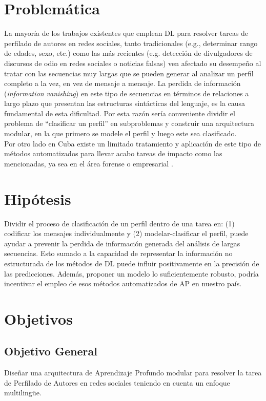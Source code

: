 \section*{Problemática}
La mayoría de los trabajos existentes que emplean DL para resolver tareas de perfilado de autores en redes sociales, tanto tradicionales (e.g., determinar rango de edades, sexo, etc.) como las más recientes (e.g. detección de divulgadores de discursos de odio en redes sociales o noticias falsas) ven afectado su desempeño al tratar con las secuencias muy largas que se pueden generar al analizar un perfil completo a la vez, en vez de mensaje a mensaje. La perdida de información (\textit{information vanishing}) en este tipo de secuencias en términos de relaciones a largo plazo que presentan las estructuras sintácticas del lenguaje, es la causa fundamental de esta dificultad. Por esta razón sería conveniente dividir el problema de ``clasificar un perfil'' en subproblemas y construir una arquitectura modular, en la que primero se modele el perfil y luego este sea clasificado.
\\
Por otro lado en Cuba existe un limitado tratamiento y aplicación de este tipo de métodos automatizados para llevar acabo tareas de impacto como las mencionadas, ya sea en el área forense o empresarial .

\section*{Hipótesis}
Dividir el proceso de clasificación de un perfil dentro de una tarea en: (1) codificar los mensajes individualmente y (2) modelar-clasificar el perfil, puede ayudar a prevenir la perdida de información generada del análisis de largas secuencias. Esto sumado a la capacidad de representar la información no estructurada de los métodos de DL puede influir positivamente en la precisión de las predicciones.  Además, proponer un modelo lo suficientemente robusto, podría incentivar el empleo de esos métodos automatizados  de AP en nuestro país.

\section*{Objetivos}
\subsection*{Objetivo General}
Diseñar una arquitectura de Aprendizaje Profundo modular para resolver la tarea de Perfilado de Autores en redes sociales teniendo en cuenta un enfoque multilingüe.
